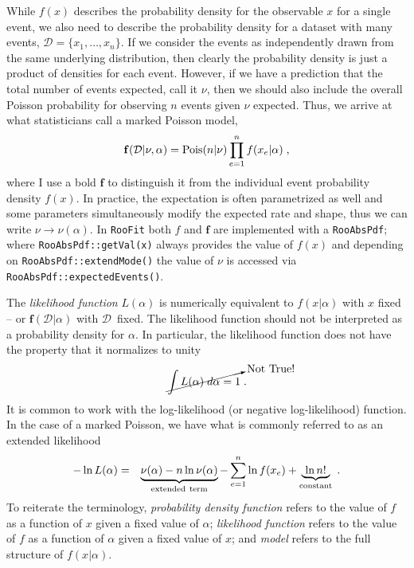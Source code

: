 \documentclass{cernrep}
\newcommand{\Pois}{{\ensuremath{\rm Pois}}}
\newcommand{\data}{{\ensuremath{\mathcal{D}}}}
\newcommand{\F}{{\ensuremath{\mathbf{f}}}}
\begin{document}
While $f(x)$ describes the probability density for the observable $x$ for a single event, we also need to describe the probability density for a dataset with many events, $\data = \{x_1,\dots,x_{n}\}$.  If we consider the events as independently drawn from the same underlying distribution, then clearly the probability density is just a product of densities for each event.  However, if we have  a prediction that the total number of events expected, call it $\nu$, then we should also include the overall Poisson probability for observing $n$ events given $\nu$ expected.  Thus, we arrive at what statisticians call a marked Poisson model,
\begin{equation}
\label{Eq:markedPoisson}
\F(\data|\nu,\alpha) = \Pois(n|\nu) \prod_{e=1}^n f(x_e|\alpha) \; ,
\end{equation}
where I use a bold $\F$ to distinguish it from the individual event probability density $f(x)$.  In practice, the expectation is often parametrized as well and some parameters simultaneously modify the expected rate and shape, thus we can write $\nu\rightarrow\nu(\alpha)$.  In \texttt{RooFit} both $f$ and $\F$ are implemented with a \texttt{RooAbsPdf}; where \texttt{RooAbsPdf::getVal(x)} always provides the value of $f(x)$ and depending on \texttt{RooAbsPdf::extendMode()} the value of $\nu$ is accessed via \texttt{RooAbsPdf::expectedEvents()}.

The \emph{likelihood function} $L(\alpha)$ is numerically equivalent to $f(x|\alpha)$ with $x$ fixed -- or $\F(\data|\alpha)$ with \data\ fixed.  The likelihood function should not be interpreted as a probability density for $\alpha$.  In particular, the likelihood function does not have the property that it normalizes to unity
\[
\cancelto{\mathrm{Not ~True!}}{\int L(\alpha) \;d\alpha = 1}\; .
\]
%
It is common to work with the log-likelihood (or negative log-likelihood) function.  In the case of a marked Poisson, we have what is commonly referred to as an extended  likelihood~\cite{Barlow1990496}
\begin{eqnarray}\nonumber
-\ln L( \alpha) &=& \underbrace{\nu(\alpha) - n \ln \nu(\alpha)}_{\rm extended~term} - \sum_{e=1}^n \ln f(x_e)   + \underbrace{~\ln n! ~}_{\mathrm{constant}}\; .
\end{eqnarray}
To reiterate the terminology, \emph{probability density function} refers to the value of $f$ as a function of $x$ given a fixed value of $\alpha$; \emph{likelihood function} refers to the value of $f$ as a function of $\alpha$ given a fixed value of $x$; and \emph{model} refers to the full structure of $f(x|\alpha)$.
\end{document}

